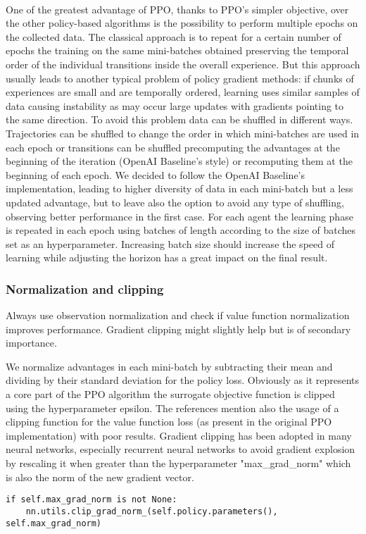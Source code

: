 \documentclass[11pt, a4paper, hidelinks]{report}
\begin{document}
\\
One of the greatest advantage of PPO, thanks to PPO's simpler objective, over the other policy-based algorithms is the possibility to perform multiple epochs on the collected data.
The classical approach is to repeat for a certain number of epochs the training on the same mini-batches obtained preserving the temporal order of the individual transitions inside the overall experience.
But this approach usually leads to another typical problem of policy gradient methods: if chunks of experiences are small and are temporally ordered, learning uses similar samples of data causing instability as may occur large updates with gradients pointing to the same direction.
To avoid this problem data can be shuffled in different ways.
Trajectories can be shuffled to change the order in which mini-batches are used in each epoch or transitions can be shuffled precomputing the advantages at the beginning of the iteration (OpenAI Baseline's style) or recomputing them at the beginning of each epoch.
We decided to follow the OpenAI Baseline's implementation, leading to higher diversity of data in each mini-batch but a less updated advantage, but to leave also the option to avoid any type of shuffling, observing better performance in the first case.
For each agent the learning phase is repeated in each epoch using batches of length according to the size of batches set as an hyperparameter.
Increasing batch size should increase the speed of learning while adjusting the horizon has a great impact on the final result.

\subsubsection{Normalization and clipping}

\begin{quoting}[font=itshape, begintext={"}, endtext={"\citep{ppo_implementation_2}}]
Always use observation normalization and check if value function normalization improves performance.
Gradient clipping might slightly help but is of secondary importance.
\end{quoting}

We normalize advantages in each mini-batch by subtracting their mean and dividing by their standard deviation for the policy loss.
Obviously as it represents a core part of the PPO algorithm the surrogate objective function is clipped using the hyperparameter epsilon.
The references mention also the usage of a clipping function for the value function loss (as present in the original PPO implementation) with poor results.
Gradient clipping has been adopted in many neural networks, especially recurrent neural networks to avoid gradient explosion by rescaling it when greater than the hyperparameter "max\_grad\_norm" which is also the norm of the new gradient vector.
\begin{lstlisting}[label={lst:gradient-clipping}]
if self.max_grad_norm is not None:
	nn.utils.clip_grad_norm_(self.policy.parameters(), self.max_grad_norm)
\end{lstlisting}
\end{document}
